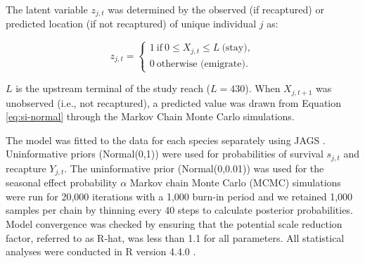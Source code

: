 \documentclass[11pt, class=article, crop=false]{standalone}
\begin{document}
The latent variable $z_{j,t}$ was determined by the observed (if recaptured) or predicted location (if not recaptured) of unique individual $j$ as: 

\begin{equation}
    z_{j,t} =
    \begin{cases}
        1~\text{if}~0 \le X_{j,t} \le L~\text{(stay)},\\
        0~\text{otherwise (emigrate)}.
    \end{cases}
\end{equation}

$L$ is the upstream terminal of the study reach ($L = 430$).
When $X_{j, t+1}$ was unobserved (i.e., not recaptured), a predicted value was drawn from Equation \ref{eq:si-normal} through the Markov Chain Monte Carlo simulations.






The model was fitted to the data for each species separately using JAGS \citep{JAGSJustAnother}. Uninformative priors (Normal(0,1)) were used for probabilities of survival $s_{j,t}$ and recapture $Y_{j,t}$. The uninformative prior (Normal(0,0.01)) was used for the seasonal effect probability $\alpha$ Markov chain Monte Carlo (MCMC) simulations were run for 20,000 iterations with a 1,000 burn-in period and we retained 1,000 samples per chain by thinning every 40 steps to calculate posterior probabilities. Model convergence was checked by ensuring that the potential scale reduction factor, referred to as R-hat, was less than 1.1 for all parameters. All statistical analyses were conducted in R version 4.4.0 \citep{CoreTeam2020}. 

\section{}


\end{document}
